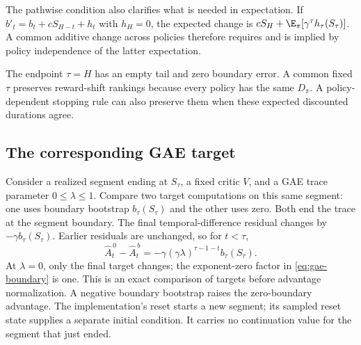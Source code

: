 The pathwise condition also clarifies what is needed in expectation. If $b'_t=b_t+cS_{H-t}+h_t$ with $h_H=0$, the expected change is $cS_H+\E_\pi[\gamma^\tau h_\tau(S_\tau)]$. A common additive change across policies therefore requires and is implied by policy independence of the latter expectation.

The endpoint $\tau=H$ has an empty tail and zero boundary error. A common fixed $\tau$ preserves reward-shift rankings because every policy has the same $D_\pi$. A policy-dependent stopping rule can also preserve them when these expected discounted durations agree.

\subsection{The corresponding GAE target}

Consider a realized segment ending at $S_\tau$, a fixed critic $V$, and a GAE trace parameter $0\le\lambda\le1$. Compare two target computations on this same segment: one uses boundary bootstrap $b_\tau(S_\tau)$ and the other uses zero. Both end the trace at the segment boundary. The final temporal-difference residual changes by $-\gamma b_\tau(S_\tau)$. Earlier residuals are unchanged, so for $t<\tau$,
\begin{equation}
\widehat A_t^{\,0}-\widehat A_t^{\,b}
=-\gamma(\gamma\lambda)^{\tau-1-t}b_\tau(S_\tau).
\label{eq:gae-boundary}
\end{equation}
At $\lambda=0$, only the final target changes; the exponent-zero factor in \eqref{eq:gae-boundary} is one. This is an exact comparison of targets before advantage normalization. A negative boundary bootstrap raises the zero-boundary advantage. The implementation's reset starts a new segment; its sampled reset state supplies a separate initial condition. It carries no continuation value for the segment that just ended.

